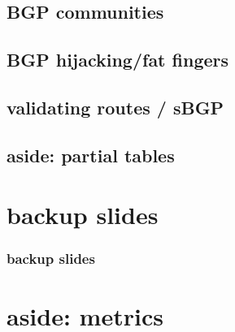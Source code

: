 \subsection{BGP communities}


\subsection{BGP hijacking/fat fingers}


\subsection{validating routes / sBGP}



\subsection{aside: partial tables}


\section{backup slides}
\begin{frame}\frametitle{backup slides}
\end{frame}

\section{aside: metrics}





